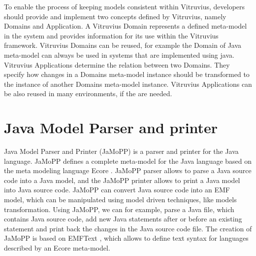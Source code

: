 To enable the process of keeping models consistent within Vitruvius, developers should provide and implement two concepts defined by Vitruvius, namely Domains and Application. A Vitruvius Domain represents a defined meta-model in the system and provides information for its use within the Vitruvius framework. Vitruvius Domains can be reused, for example the Domain of Java meta-model can always be used in systems that are implemented using java. Vitruvius Applications determine the relation between two Domains. They specify how changes in a Domains meta-model instance should be transformed to the instance of another Domains meta-model instance. Vitruvius Applications can be also reused in many environments, if the are needed. 

\section{Java Model Parser and printer}
\label{sec:Java Model Parser and printer}

Java Model Parser and Printer (JaMoPP) \cite{heidenreich2009closing} is a parser and printer for the Java language. JaMoPP defines a complete meta-model for the Java language based on the meta modeling language Ecore \cite{steinberg2008emf}. JaMoPP parser allows to parse a Java source code into a Java model, and the JaMoPP printer allows to print a Java model into Java source code. JaMoPP can convert Java source code into an EMF model, which can be manipulated using model driven techniques, like models transformation. Using JaMoPP, we can for example, parse a Java file, which contains Java source code, add new Java statements after or before an existing statement and print back the changes in the Java source code file. The creation of JaMoPP is based on EMFText \cite{heidenreich2009derivation}, which allows to define text syntax for languages described by an Ecore meta-model. 


